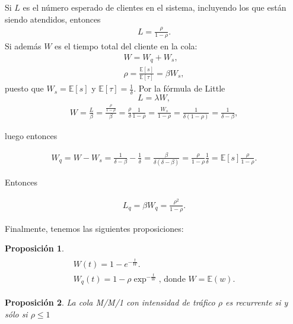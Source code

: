 \documentclass{article}
\newtheorem{Prop}{Proposición}[section]
\newcommand{\esp}{\mathbb{E}}
\numberwithin{equation}{section}
\begin{document}
Si $L$ es el n\'umero esperado de clientes en el sistema, incluyendo los que est\'an siendo atendidos, entonces
\begin{eqnarray}
L=\frac{\rho}{1-\rho}.
\end{eqnarray}
Si adem\'as $W$ es el tiempo total del cliente en la cola:
\begin{eqnarray}
W=W_{q}+W_{s},\\
\rho=\frac{\esp\left[s\right]}{\esp\left[\tau\right]}=\beta W_{s},
\end{eqnarray}
puesto que $W_{s}=\esp\left[s\right]$ y $\esp\left[\tau\right]=\frac{1}{\delta}$. Por la f\'ormula de Little
\begin{equation}
L=\lambda W,
\end{equation}
\begin{eqnarray}
W=\frac{L}{\beta}=\frac{\frac{\rho}{1-\rho}}{\beta}=\frac{\rho}{\delta}\frac{1}{1-\rho}=\frac{W_{s}}{1-\rho}=\frac{1}{\delta\left(1-\rho\right)}=\frac{1}{\delta-\beta},
\end{eqnarray}

luego entonces

\begin{eqnarray}
W_{q}=W-W_{s}=\frac{1}{\delta-\beta}-\frac{1}{\delta}=\frac{\beta}{\delta(\delta-\beta)}=\frac{\rho}{1-\rho}\frac{1}{\delta}=\esp\left[s\right]\frac{\rho}{1-\rho}.
\end{eqnarray}

Entonces

\begin{eqnarray}
L_{q}=\beta W_{q}=\frac{\rho^{2}}{1-\rho}.
\end{eqnarray}

Finalmente, tenemos las siguientes proposiciones:

\begin{Prop}
\begin{eqnarray}
\begin{array}{l}
W\left(t\right)=1-e^{-\frac{t}{W}}.\\
W_{q}\left(t\right)=1-\rho\exp^{-\frac{t}{W}}\textrm{, donde }W=\esp(w).
\end{array}
\end{eqnarray}

\end{Prop}

\begin{Prop}
La cola M/M/1 con intensidad de tr\'afico $\rho$ es recurrente si y s\'olo si $\rho\leq1$
\end{Prop}
\end{document}
